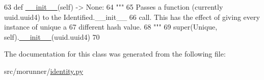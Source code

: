 \begin{DoxyCode}
63     \textcolor{keyword}{def }\hyperlink{classmorunner_1_1identity_1_1Unique_af40fb103e03b1f5ae87e3050ff1a903b}{\_\_init\_\_}(self) -> None:
64         \textcolor{stringliteral}{"""}
65 \textcolor{stringliteral}{        Passes a function (currently uuid.uuid4) to the Identified.\_\_init\_\_}
66 \textcolor{stringliteral}{        call.  This has the effect of giving every instance of unique a}
67 \textcolor{stringliteral}{        different hash value.}
68 \textcolor{stringliteral}{        """}
69         super(Unique, self).\hyperlink{classmorunner_1_1identity_1_1Unique_af40fb103e03b1f5ae87e3050ff1a903b}{\_\_init\_\_}(uuid.uuid4)
70 \end{DoxyCode}


The documentation for this class was generated from the following file\+:\begin{DoxyCompactItemize}
\item 
src/morunner/\hyperlink{identity_8py}{identity.\+py}\end{DoxyCompactItemize}
